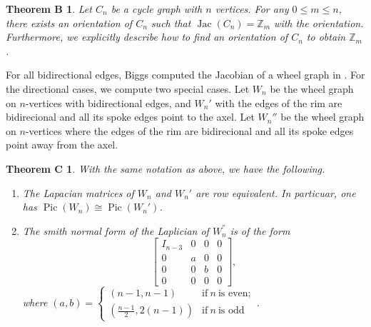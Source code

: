 \documentclass[11pt,reqno]{amsart}
\DeclareMathOperator{\Pic}{Pic}
\DeclareMathOperator{\Jac}{Jac}
\theoremstyle{definition}
\theoremstyle{plain}
\newtheorem*{nothmb}{Theorem B}
\newtheorem*{nothmc}{Theorem C}
\begin{document}
\begin{nothmb}
Let $C_n$ be a cycle graph with $n$ vertices. For any $0 \leq m \leq n$, there exists an orientation of $C_n$ such that $\Jac(C_n)=\mathbb{Z}_m$ with the orientation. Furthermore, we explicitly describe how to find an orientation of $C_n$ to obtain $\mathbb{Z}_m$. 
\end{nothmb}

For all bidirectional edges, Biggs computed the Jacobian of a wheel graph in \cite{biggs1999chip}. For the directional cases, we compute two special cases. Let $W_n$ be the wheel graph on $n$-vertices with bidirectional edges, and $W_n'$ with the edges of the rim are bidirecional and all its spoke edges point to the axel. Let $W_n{''}$ be the wheel graph on $n$-vertices where the edges of the rim are bidirecional and all its spoke edges point away from the axel. 

\begin{nothmc}
With the same notation as above, we have the following. 
\begin{enumerate}
	\item 
The Lapacian matrices of $W_n$ and $W_n'$ are row equivalent. In particuar, one has $\Pic (W_n) \cong \Pic (W_n')$.	
	\item 
The smith normal form of the Laplician of $W_n^{''}$ is of the form 
\begin{equation*}
	\left[
	\begin{array}{c|ccc}	
		I_{n-3} & 0 & 0 & 0 \\
		\hline
		0 & a & 0 & 0 \\
		0 & 0 & b & 0 \\
		0 & 0 & 0 & 0 
	\end{array}
	\right],
\end{equation*}
where 
$(a,b) = \begin{cases}
	(n-1,n-1) & \text{if}~ n ~\text{is even}; \\
	(\frac{n-1}2, 2(n-1)) & \text{if}~ n ~\text{is odd}
\end{cases}$.	
\end{enumerate}
\end{nothmc}

\end{document}
